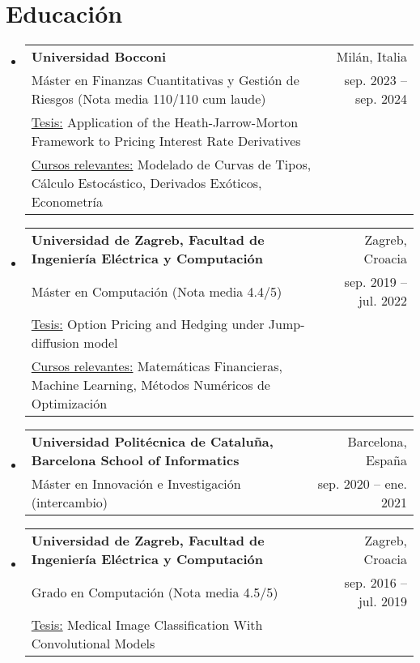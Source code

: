 \documentclass[letterpaper,10pt]{article}
\makeatletter
\newcommand{\resumeItem}[1]{
  \item\small{
    {#1 \vspace{-2pt}}
  }
}
\newcommand{\resumeSubheading}[4]{
  \vspace{-2pt}\item
    \begin{tabular*}{0.97\textwidth}[t]{l@{\extracolsep{\fill}}r}
      \textbf{#1} & #2 \\
      \small #3 & \small #4 \\
    \end{tabular*}\vspace{-7pt}
}
\newcommand{\resumeSubheadingWithAdditional}[6]{
  \vspace{-2pt}\item
    \begin{tabular*}{0.97\textwidth}[t]{l@{\extracolsep{\fill}}r}
      \textbf{#1} & #2 \\
      \small #3 & \small #4 \\
      \small #5 \\
      \small #6
    \end{tabular*}\vspace{-7pt}
}
\newcommand{\resumeSubheadingWithAdditionall}[5]{
  \vspace{-2pt}\item
    \begin{tabular*}{0.97\textwidth}[t]{l@{\extracolsep{\fill}}r}
      \textbf{#1} & #2 \\
      \small #3 & \small #4 \\
      \small #5
    \end{tabular*}\vspace{-7pt}
}
\newcommand{\resumeProjectHeading}[2]{
    \item
    \begin{tabular*}{0.97\textwidth}{l@{\extracolsep{\fill}}r}
      \small#1 & #2 \\
    \end{tabular*}\vspace{-7pt}
}
\newcommand{\resumeSubHeadingListStart}{\begin{itemize}[leftmargin=0.15in, label={}]}
\newcommand{\resumeSubHeadingListEnd}{\end{itemize}}
\newcommand{\resumeItemListStart}{\begin{itemize}}
\newcommand{\resumeItemListEnd}{\end{itemize}\vspace{-5pt}}
\makeatother
\begin{document}

\vspace{-10pt}
\section{Educación}
  \resumeSubHeadingListStart
    \resumeSubheadingWithAdditional
      {Universidad Bocconi}{Milán, Italia}
      {Máster en Finanzas Cuantitativas y Gestión de Riesgos (Nota media 110/110 cum laude)}{sep. 2023 -- sep. 2024}{\underline{Tesis:} Application of the Heath-Jarrow-Morton Framework to Pricing Interest Rate Derivatives}{\underline{Cursos relevantes:} Modelado de Curvas de Tipos, Cálculo Estocástico, Derivados Exóticos, Econometría}
    \resumeSubheadingWithAdditional
      {Universidad de Zagreb, Facultad de Ingeniería Eléctrica y Computación}{Zagreb, Croacia}
      {Máster en Computación (Nota media 4.4/5)}{sep. 2019 -- jul. 2022}{\underline{Tesis:} Option Pricing and Hedging under Jump-diffusion model}
      {\underline{Cursos relevantes:} Matemáticas Financieras, Machine Learning, Métodos Numéricos de Optimización}
    \resumeSubheading 
      {Universidad Politécnica de Cataluña, Barcelona School of Informatics}{Barcelona, España}
      {Máster en Innovación e Investigación (intercambio)}{sep. 2020 -- ene. 2021}
    \resumeSubheadingWithAdditionall
      {Universidad de Zagreb, Facultad de Ingeniería Eléctrica y Computación}{Zagreb, Croacia}
      {Grado en Computación (Nota media 4.5/5)}{sep. 2016 -- jul. 2019}{\underline{Tesis:} Medical Image Classification With Convolutional Models}
  \resumeSubHeadingListEnd
\end{document}
